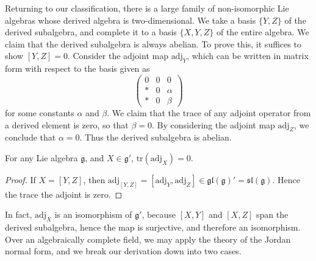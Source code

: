 Returning to our classification, there is a large family of non-isomorphic Lie algebras whose derived algebra is two-dimensional. We take a basis $\{ Y,Z \}$ of the derived subalgebra, and complete it to a basis $\{ X,Y,Z \}$ of the entire algebra. We claim that the derived subalgebra is always abelian. To prove this, it suffices to show $[Y,Z] = 0$. Consider the adjoint map $\text{adj}_Y$, which can be written in matrix form with respect to the basis given as
%
\[ \begin{pmatrix} 0 & 0 & 0 \\ * & 0 & \alpha \\ * & 0 & \beta \end{pmatrix} \]
%
for some constants $\alpha$ and $\beta$. We claim that the trace of any adjoint operator from a derived element is zero, so that $\beta = 0$. By considering the adjoint map $\text{adj}_Z$, we conclude that $\alpha = 0$. Thus the derived subalgebra is abelian.

\begin{lemma}
    For any Lie algebra $\mathfrak{g}$, and $X \in \mathfrak{g}'$, $\text{tr}(\text{adj}_X) = 0$.
\end{lemma}
\begin{proof}
    If $X = [Y,Z]$, then $\text{adj}_{[Y,Z]} = [\text{adj}_Y, \text{adj}_Z] \in \mathfrak{gl}(\mathfrak{g})' = \mathfrak{sl}(\mathfrak{g})$. Hence the trace the adjoint is zero.
\end{proof}

In fact, $\text{adj}_X$ is an isomorphism of $\mathfrak{g}'$, because $[X,Y]$ and $[X,Z]$ span the derived subalgebra, hence the map is surjective, and therefore an isomorphism. Over an algebraically complete field, we may apply the theory of the Jordan normal form, and we break our derivation down into two cases.

